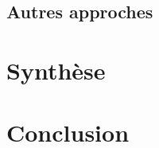 \documentclass[a4paper,12pt]{report}
\theoremstyle{plain}				%
\theoremstyle{definition}				%
\begin{document}
\subsection{Autres approches}

\section{Synthèse}

\section{Conclusion}









\medskip


\end{document}
